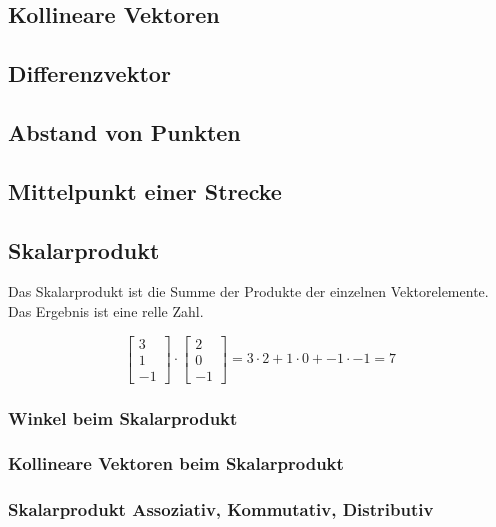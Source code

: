 \subsection{Kollineare Vektoren}

\subsection{Differenzvektor}

\subsection{Abstand von Punkten}

\subsection{Mittelpunkt einer Strecke}

\subsection{Skalarprodukt}

Das Skalarprodukt ist die Summe der Produkte der einzelnen Vektorelemente.
Das Ergebnis ist eine relle Zahl.

\begin{equation*}
    \begin{bmatrix}
        3 \\
        1 \\
        -1
    \end{bmatrix} \cdot
    \begin{bmatrix}
        2 \\
        0 \\
        -1
    \end{bmatrix} = 3 \cdot 2 + 1 \cdot 0 + -1 \cdot -1 = 7
\end{equation*}

\subsubsection{Winkel beim Skalarprodukt}

\subsubsection{Kollineare Vektoren beim Skalarprodukt}

\subsubsection{Skalarprodukt Assoziativ, Kommutativ, Distributiv}


